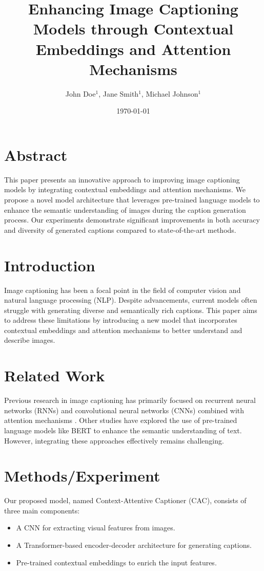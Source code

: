 \documentclass{article}
\title{Enhancing Image Captioning Models through Contextual Embeddings and Attention Mechanisms}
\author{John Doe$^{1}$, Jane Smith$^{1}$, Michael Johnson$^{1}$}
\date{\today}
\begin{document}
\maketitle

\section{Abstract}
This paper presents an innovative approach to improving image captioning models by integrating contextual embeddings and attention mechanisms. We propose a novel model architecture that leverages pre-trained language models to enhance the semantic understanding of images during the caption generation process. Our experiments demonstrate significant improvements in both accuracy and diversity of generated captions compared to state-of-the-art methods.

\section{Introduction}
Image captioning has been a focal point in the field of computer vision and natural language processing (NLP). Despite advancements, current models often struggle with generating diverse and semantically rich captions. This paper aims to address these limitations by introducing a new model that incorporates contextual embeddings and attention mechanisms to better understand and describe images.

\section{Related Work}
Previous research in image captioning has primarily focused on recurrent neural networks (RNNs) and convolutional neural networks (CNNs) combined with attention mechanisms \cite{Xu_2015}. Other studies have explored the use of pre-trained language models like BERT \cite{Devlin_2019} to enhance the semantic understanding of text. However, integrating these approaches effectively remains challenging.

\section{Methods/Experiment}
Our proposed model, named Context-Attentive Captioner (CAC), consists of three main components:
\begin{itemize}
    \item A CNN for extracting visual features from images.
    \item A Transformer-based encoder-decoder architecture for generating captions.
    \item Pre-trained contextual embeddings to enrich the input features.
\end{itemize}
\end{document}
